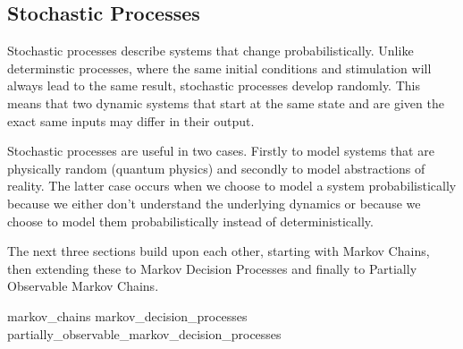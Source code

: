 \subsection{Stochastic Processes}

Stochastic processes describe systems that change probabilistically. Unlike determinstic processes, where the same initial conditions and stimulation will always lead to the same result, stochastic processes develop randomly. This means that two dynamic systems that start at the same state and are given the exact same inputs may differ in their output.

Stochastic processes are useful in two cases. Firstly to model systems that are physically random (quantum physics) and secondly to model abstractions of reality. The latter case occurs when we choose to model a system probabilistically because we either don't understand the underlying dynamics or because we choose to model them probabilistically instead of deterministically.

The next three sections build upon each other, starting with Markov Chains, then extending these to Markov Decision Processes and finally to Partially Observable Markov Chains.

{markov_chains}
{markov_decision_processes}
{partially_observable_markov_decision_processes}
